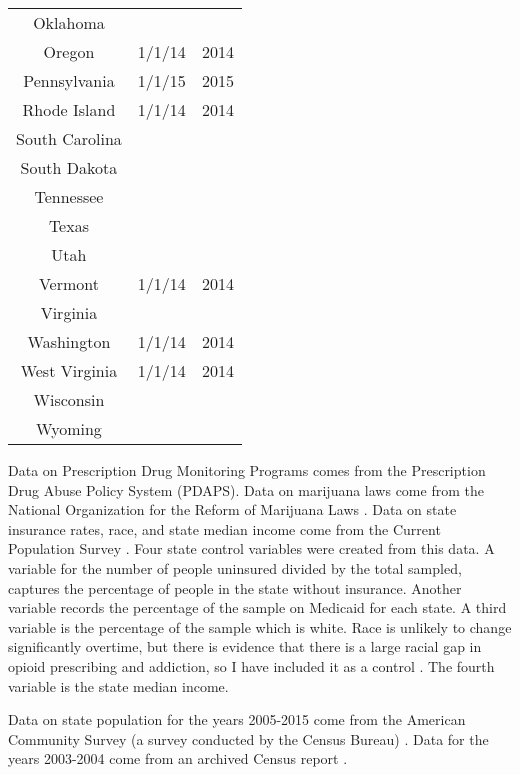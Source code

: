\documentclass[11pt]{article}
\begin{document}
\begin{table}
\begin{tabular}{ccc}
 Oklahoma &&\\
 Oregon & 1/1/14 & 2014\\
 Pennsylvania & 1/1/15 & 2015\\
 Rhode Island & 1/1/14 & 2014\\
 South Carolina &&\\
 South Dakota &&\\
 Tennessee &&\\
 Texas &&\\
 Utah &&\\
 Vermont &1/1/14 & 2014\\
 Virginia &&\\
 Washington & 1/1/14 & 2014\\
 West Virginia & 1/1/14 & 2014\\
 Wisconsin &&\\
 Wyoming &&\\ 
\hline
\end{tabular}
\end{table}

\cleardoublepage

Data on Prescription Drug Monitoring Programs comes from the Prescription Drug Abuse Policy System (PDAPS). Data on marijuana laws come from the National Organization for the Reform of Marijuana Laws \citep{NORML}.  Data on state insurance rates, race, and state median income come from the Current Population Survey \citep{U.S.CensusBureau2016}.  Four state control variables were created from this data.  A variable for the number of people uninsured divided by the total sampled, captures the percentage of people in the state without insurance.  Another variable records the percentage of the sample on Medicaid for each state.  A third variable is the percentage of the sample which is white.  Race is unlikely to change significantly overtime, but there is evidence that there is a large racial gap in opioid prescribing and addiction, so I have included it as a control \citep{Johnson2016}.  The fourth variable is the state median income.  

Data on state population for the years 2005-2015 come from the American Community Survey (a survey conducted by the Census Bureau) \citep{U.S.CensusBureau2017}.  Data for the years 2003-2004 come from an archived Census report \citep{U.S.CensusBureau2006}.  
\end{document}

